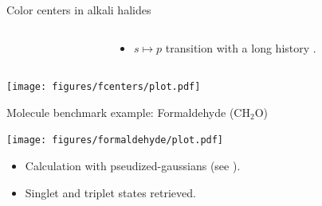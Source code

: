 \documentclass[final]{beamer}
\begin{document}
\begin{frame}[fragile]{}
\begin{columns}[t]
\begin{column}{.49\linewidth}
\begin{block}{\large Color centers in alkali halides}
\begin{center}
        \begin{columns}
          \begin{column}{0.7\textwidth}
          \end{column}
          \begin{column}{0.3\textwidth}
            \begin{itemize}
              \item
                $ s \mapsto p $ transition with a long history
                \cite{pohl1925}.
            \end{itemize}
          \end{column}
        \end{columns}
        \texttt{[image: figures/fcenters/plot.pdf]}

      \end{center}
      \end{block}

      \begin{block}{\large Molecule benchmark example: Formaldehyde (CH$_2$O)}
        \begin{center}
          \texttt{[image: figures/formaldehyde/plot.pdf]}
        \end{center}
        \begin{itemize}
          \item
            Calculation with pseudized-gaussians
              (see \cite{10.10631.4961301}).
          \item
            Singlet and triplet states retrieved.
        \end{itemize}
      \end{block}


\end{column}
\end{columns}
\end{frame}
\end{document}
